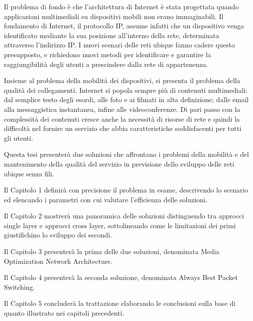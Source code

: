 \documentclass[12pt,a4paper,openright,twoside,draft]{book}
\begin{document}
Il problema di fondo è che l'architettura di Internet è stata
progettata quando applicazioni multimediali su dispositivi mobili non
erano immaginabili. Il fondamento di Internet, il protocollo IP,
assume infatti che un dispositivo venga identificato mediante la sua
posizione all'interno della rete, determinata attraverso l'indirizzo
IP. I nuovi scenari delle reti ubique fanno cadere questo presupposto,
e richiedono nuovi metodi per identificare e garantire la
raggiungibilità degli utenti a prescindere dalla rete di appartenenza.

Insieme al problema della mobilità dei dispositivi, si presenta il
problema della qualità dei collegamenti. Internet si popola sempre più
di contenuti multimediali: dal semplice testo degli esordi, alle foto
e ai filmati in alta definizione; dalle email alla messaggistica
instantanea, infine alle videoconferenze. Di pari passo con la
complessità dei contenuti cresce anche la necessità di risorse di rete
e quindi la difficoltà nel fornire un servizio che abbia
caratteristiche soddisfacenti per tutti gli utenti.

Questa tesi presenterà due soluzioni che affrontano i problemi della
mobilità e del mantenimento della qualità del servizio in previsione
dello sviluppo delle reti ubique senza fili.

Il Capitolo 1 definirà con precisione il problema in esame,
descrivendo lo scenario ed elencando i parametri con cui valutare
l'efficienza delle soluzioni.

Il Capitolo 2 mostrerà una panoramica delle soluzioni distinguendo tra
approcci single layer e approcci cross layer, sottolineando come le
limitazioni dei primi giustifichino lo sviluppo dei secondi.

Il Capitolo 3 presenterà la prima delle due soluzioni, denominata
Media Optimization Network Architecture.

Il Capitolo 4 presenterà la seconda soluzione, denominata Always Best
Packet Switching.

Il Capitolo 5 concluderà la trattazione elaborando le conclusioni
sulla base di quanto illustrato nei capitoli precedenti.

\clearpage{\pagestyle{empty}\cleardoublepage}

\tableofcontents
\rhead[\fancyplain{}{\bfseries\leftmark}]{\fancyplain{}{\bfseries\thepage}}
\clearpage{\pagestyle{empty}\cleardoublepage}
\end{document}
